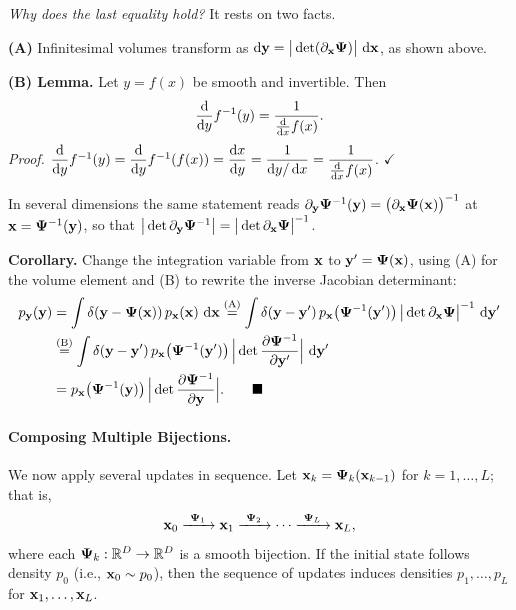 \begin{nknote}
\noindent\textit{Why does the last equality hold?} It rests on two facts.

\smallskip\noindent
\textbf{(A)} Infinitesimal volumes transform as $\mathop{}\!\mathrm{d}{\mathbf{y}} = \big|\det(\partial_{\mathbf{x}}\bm{\Psi})\big|\,\mathop{}\!\mathrm{d}{\mathbf{x}}$, as shown above.

\smallskip\noindent
\textbf{(B) Lemma.} Let $y = f(x)$ be smooth and invertible. Then
\[
\frac{\mathop{}\!\mathrm{d}}{\mathop{}\!\mathrm{d} y} f^{-1}(y) = \frac{1}{\frac{\mathop{}\!\mathrm{d}}{\mathop{}\!\mathrm{d} x} f(x)}.
\]
\textit{Proof.}
$\dfrac{\diff}{\diff y} f^{-1}(y) = \dfrac{\diff}{\diff y} f^{-1}(f(x)) = \dfrac{\diff x}{\diff y} = \dfrac{1}{\diff y/\diff x} = \dfrac{1}{\frac{\diff}{\diff x} f(x)}$. \hfill$\checkmark$

\noindent
In several dimensions the same statement reads $\partial_{\mathbf{y}}\bm{\Psi}^{-1}({\mathbf{y}}) = \big(\partial_{\mathbf{x}}\bm{\Psi}({\mathbf{x}})\big)^{-1}$ at ${\mathbf{x}} = \bm{\Psi}^{-1}({\mathbf{y}})$, so that $\big|\det \partial_{\mathbf{y}}\bm{\Psi}^{-1}\big| = \big|\det \partial_{\mathbf{x}}\bm{\Psi}\big|^{-1}$.

\smallskip\noindent
\textbf{Corollary.} Change the integration variable from ${\mathbf{x}}$ to ${\mathbf{y}}' = \bm{\Psi}({\mathbf{x}})$, using (A) for the volume element and (B) to rewrite the inverse Jacobian determinant:
\begin{align*}
p_{{\mathbf{y}}}({\mathbf{y}})
&= \int \delta({\mathbf{y}} - \bm{\Psi}({\mathbf{x}}))\, p_{{\mathbf{x}}}({\mathbf{x}})\,\mathop{}\!\mathrm{d}{\mathbf{x}}
\overset{\text{(A)}}{=} \int \delta({\mathbf{y}} - {\mathbf{y}}')\, p_{{\mathbf{x}}}\big(\bm{\Psi}^{-1}({\mathbf{y}}')\big)\,\big|\det \partial_{\mathbf{x}}\bm{\Psi}\big|^{-1}\,\mathop{}\!\mathrm{d}{\mathbf{y}}' \\
&\overset{\text{(B)}}{=} \int \delta({\mathbf{y}} - {\mathbf{y}}')\, p_{{\mathbf{x}}}\big(\bm{\Psi}^{-1}({\mathbf{y}}')\big)\,\Big|\det \frac{\partial \bm{\Psi}^{-1}}{\partial {\mathbf{y}}'}\Big|\,\mathop{}\!\mathrm{d}{\mathbf{y}}' \\
&= p_{{\mathbf{x}}}\big(\bm{\Psi}^{-1}({\mathbf{y}})\big)\,\Big|\det \frac{\partial \bm{\Psi}^{-1}}{\partial {\mathbf{y}}}\Big|. \qquad\blacksquare
\end{align*}
\end{nknote}



\paragraph{Composing Multiple Bijections.} We now apply several updates in sequence.  
Let ${\mathbf{x}}_k = \bm{\Psi}_k({\mathbf{x}}_{k-1})$ for $k=1,\dots,L$; that is,
\[
\rvx_0 \xrightarrow{\ \bm{\Psi}_1\ } \rvx_1 \xrightarrow{\ \bm{\Psi}_2\ } \cdots
\xrightarrow{\ \bm{\Psi}_L\ } \rvx_L,
\]
where each $\bm{\Psi}_k:\mathbb{R}^D \to \mathbb{R}^D$ is a smooth bijection.  
If the initial state follows density $p_0$ (i.e., ${\mathbf{x}}_0 \sim p_0$), then the sequence of updates induces densities $p_1,\dots,p_L$ for ${\mathbf{x}}_1,\dots,{\mathbf{x}}_L$.  

